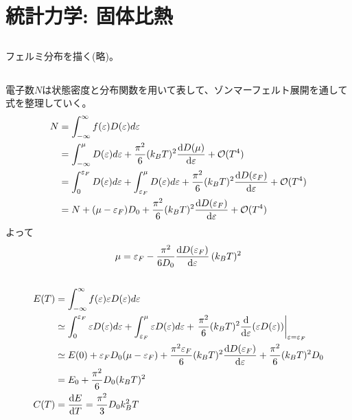 \documentclass[../ap_2010.tex]{subfiles}
\begin{document}
\chapter{統計力学: 固体比熱}
\section{}
フェルミ分布を描く(略)。
\section{}
電子数\(N\)は状態密度と分布関数を用いて表して、ゾンマーフェルト展開を通して式を整理していく。
\begin{equation}\begin{aligned}[b]
    N &= \int_{-\infty}^{\infty}f(\varepsilon)D(\varepsilon)d\varepsilon\\
    &= \int_{-\infty}^{\mu}D(\varepsilon)d\varepsilon + \frac{\pi^2}{6}(k_BT)^2\dv{D(\mu)}{\varepsilon}+\mathcal{O}(T^4)\\
    &= \int_{0}^{\varepsilon_F}D(\varepsilon)d\varepsilon
    +\int_{\varepsilon_F}^{\mu}D(\varepsilon)d\varepsilon
    + \frac{\pi^2}{6}(k_BT)^2\dv{D(\varepsilon_F)}{\varepsilon}+\mathcal{O}(T^4)\\
    &= N  +(\mu-\varepsilon_F)D_0+ \frac{\pi^2}{6}(k_BT)^2\dv{D(\varepsilon_F)}{\varepsilon}+\mathcal{O}(T^4)
\end{aligned}\end{equation}
よって
\begin{equation}\begin{aligned}[b]
    \mu = \varepsilon_F- \frac{\pi^2}{6D_0}\dv{D(\varepsilon_F)}{\varepsilon}\,(k_BT)^2
\end{aligned}\end{equation}

\section{}
\begin{equation}\begin{aligned}[b]
    E(T) &= \int_{-\infty}^{\infty}f(\varepsilon)\varepsilon D(\varepsilon)d\varepsilon\\
    &\simeq \int_{0}^{\varepsilon_F}\varepsilon D(\varepsilon)d\varepsilon
    +\int_{\varepsilon_F}^{\mu}\varepsilon D(\varepsilon)d\varepsilon
    +\left.\frac{\pi^2}{6}(k_BT)^2\dv{\varepsilon}\qty(\varepsilon D(\varepsilon))\right|_{\varepsilon=\varepsilon_F}\\
    &\simeq E(0)+\varepsilon_FD_0(\mu-\varepsilon_F)+\frac{\pi^2\varepsilon_F}{6}(k_BT)^2\dv{D(\varepsilon_F)}{\varepsilon}+\frac{\pi^2}{6}(k_BT)^2D_0\\
    &= E_0 + \frac{\pi^2}{6}D_0(k_BT)^2\\
    C(T) &= \dv{E}{T}=\frac{\pi^2}{3}D_0k_B^2T
\end{aligned}\end{equation}
\end{document}
